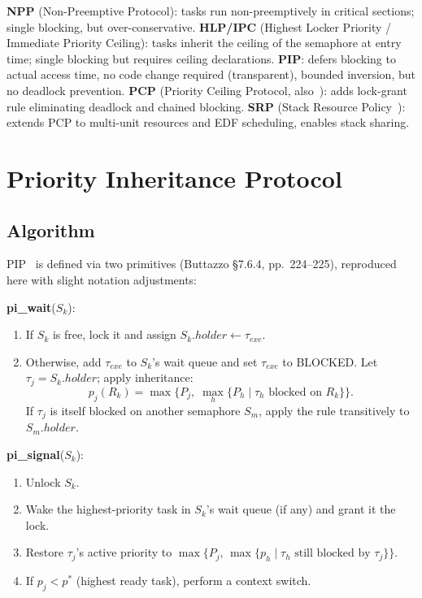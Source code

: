 \documentclass[conference]{IEEEtran}
\begin{document}
\textbf{NPP} (Non-Preemptive Protocol): tasks run non-preemptively
in critical sections; single blocking, but over-conservative.
\textbf{HLP/IPC} (Highest Locker Priority / Immediate Priority
Ceiling): tasks inherit the ceiling of the semaphore at entry time;
single blocking but requires ceiling declarations.
\textbf{PIP}: defers blocking to actual access time, no code change
required (transparent), bounded inversion, but no deadlock prevention.
\textbf{PCP} (Priority Ceiling Protocol, also~\cite{Sha1990}):
adds lock-grant rule eliminating deadlock and chained blocking.
\textbf{SRP} (Stack Resource Policy~\cite{Baker1991}): extends PCP
to multi-unit resources and EDF scheduling, enables stack sharing.

\section{Priority Inheritance Protocol}
\label{sec:pip}

\subsection{Algorithm}

PIP~\cite{Sha1990} is defined via two primitives (Buttazzo §7.6.4,
pp.~224--225), reproduced here with slight notation adjustments:

\medskip
\noindent\textbf{pi\_wait}($S_k$):
\begin{enumerate}
  \item If $S_k$ is free, lock it and assign $S_k.\mathit{holder} \leftarrow \tau_{\mathit{exe}}$.
  \item Otherwise, add $\tau_{\mathit{exe}}$ to $S_k$'s wait queue and
        set $\tau_{\mathit{exe}}$ to BLOCKED.
        Let $\tau_j = S_k.\mathit{holder}$; apply inheritance:
        \begin{equation}
          p_j(R_k) = \max\!\bigl\{P_j,\;\max_h\{P_h \mid \tau_h\text{ blocked on }R_k\}\bigr\}.
          \label{eq:pip}
        \end{equation}
        If $\tau_j$ is itself blocked on another semaphore $S_m$,
        apply the rule transitively to $S_m.\mathit{holder}$.
\end{enumerate}

\noindent\textbf{pi\_signal}($S_k$):
\begin{enumerate}
  \item Unlock $S_k$.
  \item Wake the highest-priority task in $S_k$'s wait queue (if any)
        and grant it the lock.
  \item Restore $\tau_j$'s active priority to
        $\max\bigl\{P_j,\,\max\{p_h \mid \tau_h \text{ still blocked by } \tau_j\}\bigr\}$.
  \item If $p_j < p^*$ (highest ready task), perform a context switch.
\end{enumerate}
\end{document}

